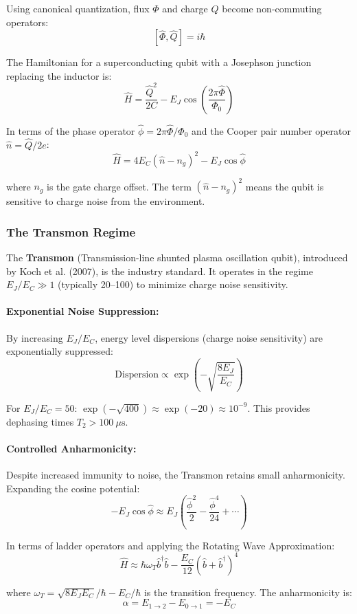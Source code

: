 \documentclass{article}
\begin{document}
Using canonical quantization, flux $\Phi$ and charge $Q$ become non-commuting operators:
$$[\hat{\Phi}, \hat{Q}] = i\hbar$$

The Hamiltonian for a superconducting qubit with a Josephson junction replacing the inductor is:
$$\hat{H} = \frac{\hat{Q}^2}{2C} - E_J \cos\left(\frac{2\pi \hat{\Phi}}{\Phi_0}\right)$$

In terms of the phase operator $\hat{\phi} = 2\pi\hat{\Phi}/\Phi_0$ and the Cooper pair number operator $\hat{n} = \hat{Q}/2e$:
$$\hat{H} = 4E_C(\hat{n} - n_g)^2 - E_J \cos \hat{\phi}$$

where $n_g$ is the gate charge offset. The term $(\hat{n} - n_g)^2$ means the qubit is sensitive to charge noise from the environment.

\subsubsection*{The Transmon Regime}

The \textbf{Transmon} (Transmission-line shunted plasma oscillation qubit), introduced by Koch et al. (2007), is the industry standard. It operates in the regime $E_J / E_C \gg 1$ (typically 20–100) to minimize charge noise sensitivity.

\paragraph{Exponential Noise Suppression:}
By increasing $E_J / E_C$, energy level dispersions (charge noise sensitivity) are exponentially suppressed:
$$\text{Dispersion} \propto \exp\left(-\sqrt{\frac{8 E_J}{E_C}}\right)$$

For $E_J / E_C = 50$: $\exp(-\sqrt{400}) \approx \exp(-20) \approx 10^{-9}$. This provides dephasing times $T_2 > 100~\mu\text{s}$.

\paragraph{Controlled Anharmonicity:}
Despite increased immunity to noise, the Transmon retains small anharmonicity. Expanding the cosine potential:
$$-E_J \cos \hat{\phi} \approx E_J\left(\frac{\hat{\phi}^2}{2} - \frac{\hat{\phi}^4}{24} + \cdots\right)$$

In terms of ladder operators and applying the Rotating Wave Approximation:
$$\hat{H} \approx \hbar\omega_T \hat{b}^\dagger\hat{b} - \frac{E_C}{12}(\hat{b} + \hat{b}^\dagger)^4$$

where $\omega_T = \sqrt{8 E_J E_C}/\hbar - E_C/\hbar$ is the transition frequency. The anharmonicity is:
$$\alpha = E_{1\to 2} - E_{0\to 1} = -E_C$$
\end{document}
